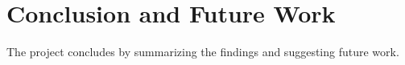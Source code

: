 \section{Conclusion and Future Work}

The project concludes by summarizing the findings and suggesting future work.



